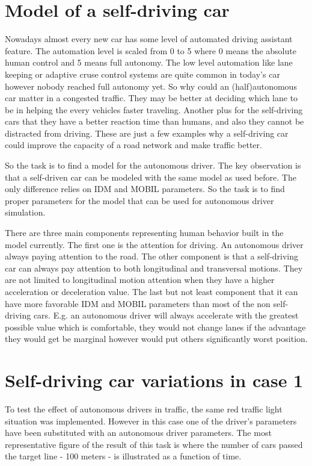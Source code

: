 	\section{Model of a self-driving car}
		Nowadays almost every new car has some level of automated driving assistant feature. The automation level is scaled from 0 to 5 where 0 means the absolute human control and 5 means full autonomy. The low level automation like lane keeping or adaptive cruse control systems are quite common in today's car however nobody reached full autonomy yet. So why could an (half)autonomous car matter in a congested traffic. They may be better at deciding which lane to be in helping the every vehicles faster traveling. Another plus for the self-driving cars that they have a better reaction time than humans, and also they cannot be distracted from driving. These are just a few examples why a self-driving car could improve the capacity of a road network and make traffic better.

		So the task is to find a model for the autonomous driver. The key observation is that a self-driven car can be modeled with the same model as used before. The only difference relies on IDM and MOBIL parameters. So the task is to find proper parameters for the model that can be used for autonomous driver simulation.
	
		There are three main components representing human behavior built in the model currently. The first one is the attention for driving. An autonomous driver always paying attention to the road. The other component is that a self-driving car can always pay attention to both longitudinal and transversal motions. They are not limited to longitudinal motion attention when they have a higher acceleration or deceleration value. The last but not least component that it can have more favorable IDM and MOBIL parameters than most of the non self-driving cars. E.g. an autonomous driver will always accelerate with the greatest possible value which is comfortable, they would not change lanes if the advantage they would get be marginal however would put others significantly worst position.
	\section{Self-driving car variations in case 1}
		To test the effect of autonomous drivers in traffic, the same red traffic light situation was implemented. However in this case one of the driver's parameters have been substituted with an autonomous driver parameters. The most representative figure of the result of this task is where the number of cars passed the target line - 100 meters - is illustrated as a function of time.
